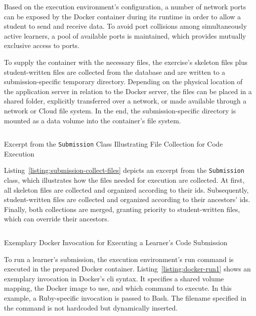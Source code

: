Based on the execution environment's configuration, a number of network ports can be exposed by the Docker container during its runtime in order to allow a student to send and receive data. To avoid port collisions among simultaneously active learners, a pool of available ports is maintained, which provides mutually exclusive access to ports.

To supply the container with the necessary files, the exercise's skeleton files plus student-written files are collected from the database and are written to a submission-specific temporary directory. Depending on the physical location of the application server in relation to the Docker server, the files can be placed in a shared folder, explicitly transferred over a network, or made available through a network or Cloud file system. In the end, the submission-specific directory is mounted as a data volume into the container's file system.

\begin{listing}
\inputminted[frame=lines]{rb}{listings/submission.rb}
\vspace{-0.33cm}
\caption{Excerpt from the \texttt{Submission} Class Illustrating File Collection for Code Execution}
\label{listing:submission-collect-files}
\end{listing}

Listing~\ref{listing:submission-collect-files} depicts an excerpt from the \texttt{Submission} class, which illustrates how the files needed for execution are collected. At first, all skeleton files are collected and organized according to their \glspl{id}. Subsequently, student-written files are collected and organized according to their ancestors' \glspl{id}. Finally, both collections are merged, granting priority to student-written files, which can override their ancestors.

\begin{listing}
\inputminted[frame=lines]{sh}{listings/docker-run1.sh}
\vspace{-0.33cm}
\caption{Exemplary Docker Invocation for Executing a Learner’s Code Submission}
\label{listing:docker-run1}
\end{listing}

To run a learner's submission, the execution environment's run command is executed in the prepared Docker container. Listing~\ref{listing:docker-run1} shows an exemplary invocation in Docker's \gls{cli} syntax. It specifies a shared volume mapping, the Docker image to use, and which command to execute. In this example, a Ruby-specific invocation is passed to Bash. The filename specified in the command is not hardcoded but dynamically inserted.


